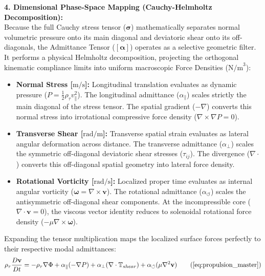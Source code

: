 \documentclass[11pt, a4paper]{article}
\begin{document}
\textbf{4. Dimensional Phase-Space Mapping (Cauchy-Helmholtz Decomposition):} \\
Because the full Cauchy stress tensor ($\boldsymbol{\sigma}$) mathematically separates normal volumetric pressure onto its main diagonal and deviatoric shear onto its off-diagonals, the Admittance Tensor ($[\boldsymbol{\alpha}]$) operates as a selective geometric filter. It performs a physical Helmholtz decomposition, projecting the orthogonal kinematic compliance limits into uniform macroscopic Force Densities ($\text{N/m}^3$):

\begin{itemize}[leftmargin=*]
    \item \textbf{Normal Stress [$\text{m/s}$]:} Longitudinal translation evaluates as dynamic pressure ($P = \frac{1}{2}\rho_{\tau} v_{\parallel}^2$). The longitudinal admittance ($\alpha_{\parallel}$) scales strictly the main diagonal of the stress tensor. The spatial gradient ($-\nabla$) converts this normal stress into irrotational compressive force density ($\nabla \times \nabla P = 0$).
    \item \textbf{Transverse Shear [$\text{rad/m}$]:} Transverse spatial strain evaluates as lateral angular deformation across distance. The transverse admittance ($\alpha_{\perp}$) scales the symmetric off-diagonal deviatoric shear stresses ($\tau_{ij}$). The divergence ($\nabla \cdot$) converts this off-diagonal spatial geometry into lateral force density.
    \item \textbf{Rotational Vorticity [$\text{rad/s}$]:} Localized proper time evaluates as internal angular vorticity ($\boldsymbol{\omega} = \nabla \times \mathbf{v}$). The rotational admittance ($\alpha_{\circlearrowleft}$) scales the antisymmetric off-diagonal shear components. At the incompressible core ($\nabla \cdot \mathbf{v} = 0$), the viscous vector identity reduces to solenoidal rotational force density ($-\mu \nabla \times \boldsymbol{\omega}$).
\end{itemize}

Expanding the tensor multiplication maps the localized surface forces perfectly to their respective modal admittances:
\begin{equation}
    \rho_{\tau} \frac{D\mathbf{v}}{Dt} = -\rho_{\tau} \nabla \Phi + \alpha_{\parallel}(-\nabla P) + \alpha_{\perp}(\nabla \cdot \mathbb{T}_{shear}) + \alpha_{\circlearrowleft}(\mu \nabla^2 \mathbf{v}) \tag{\ref{eq:propulsion_master}}
\end{equation}
\end{document}
